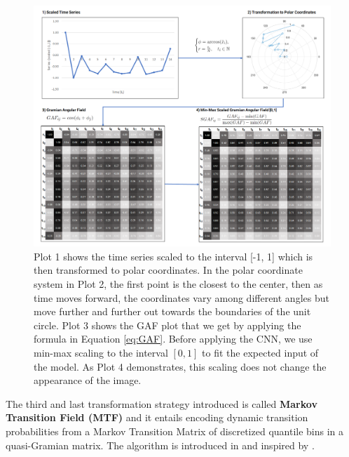 \documentclass[11pt, a4paper]{article}
\begin{document}
\begin{figure}[ht]
    \centering
    \includegraphics[width=\textwidth]{images/GAF.png}
    \caption{Plot 1 shows the time series scaled to the interval [-1, 1] which is then transformed to polar coordinates. In the polar coordinate system in Plot 2, the first point is the closest to the center, then as time moves forward, the coordinates vary among different angles but move further and further out towards the boundaries of the unit circle. Plot 3 shows the GAF plot that we get by applying the formula in Equation \ref{eq:GAF}. Before applying the CNN, we use min-max scaling to the interval $[0,1]$ to fit the expected input of the model. As Plot 4 demonstrates, this scaling does not change the appearance of the image.}
    \label{fig:GAF}
\end{figure}


The third and last transformation strategy introduced is called \textbf{Markov Transition Field (MTF)} and it entails encoding dynamic transition probabilities from a Markov Transition Matrix of discretized quantile bins in a quasi-Gramian matrix. The algorithm is introduced in \cite{wang2015encoding} and inspired by \cite{campanharo2011duality}.
\end{document}
